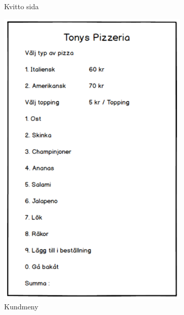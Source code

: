 \documentclass{article}
\theoremstyle{remark}                                         %
\begin{document}
\begin{figure}
\begin{subfigure}[b]{0.3\textwidth}
        \caption{Kvitto sida}
    \end{subfigure}
        \begin{subfigure}[b]{0.3\textwidth}
        \includegraphics[width=\textwidth]{img/Skissbilder/Screen3.PNG}
        \caption{Kundmeny}
    \end{subfigure}
        \begin{subfigure}[b]{0.3\textwidth}

\end{subfigure}
\end{figure}
\end{document}
